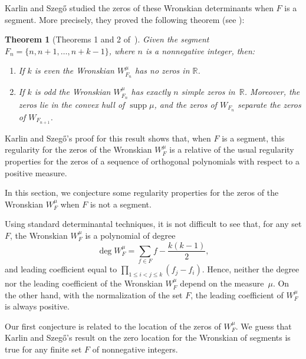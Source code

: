 \documentclass[10pt]{article}
\theoremstyle{plain}
\newtheorem{theorem}{Theorem}[section]
\theoremstyle{definition}
\numberwithin{equation}{section} %
\newcommand\RR{\mathbb{R}}
\newcommand\supp{\operatorname{supp}}
\begin{document}

Karlin and Szeg\H{o} studied the zeros of these Wronskian determinants when $F$ is a segment. 
More precisely, they proved the following theorem (see \cite{KS}):

\begin{theorem}[Theorems 1 and 2 of~\cite{KS}]
\label{KST12}
Given the segment $F_n=\{n,\allowbreak n+1,\allowbreak\dots,\allowbreak n+k-1\}$, where $n$ is a nonnegative integer, then:
\begin{enumerate}
\item If $k$ is even the Wronskian $W_{F_n}^\mu$ has no zeros in $\RR$.
\item If $k$ is odd the Wronskian $W_{F_n}^\mu$ has exactly $n$ simple zeros in~$\RR$. Moreover, the zeros lie in the convex hull of $\supp\mu$, and the zeros of $W_{F_n}$ separate the zeros of $W_{F_{n+1}}$.
\end{enumerate}
\end{theorem}

Karlin and Szeg\H{o}'s proof for this result shows that, when $F$ is a segment, this regularity for the zeros of the Wronskian $W_F^\mu$ is a relative of the usual regularity properties for the zeros of a sequence of orthogonal polynomials  with respect to a positive measure.

In this section, we conjecture some regularity properties for the zeros of the Wronskian $W_F^\mu$ when $F$ is not a segment.

Using standard determinantal techniques, it is not difficult to see that,
for any set $F$, the Wronskian $W_F^\mu$ is a polynomial of degree
\begin{equation}\label{degWf}
\deg W^\mu _F=\sum_{f\in F}f-\frac{k(k-1)}{2},
\end{equation}
and leading coefficient equal
to $\prod_{1\le i<j\le k}(f_j-f_i)$. Hence,
neither the degree nor the
leading coefficient of the Wronskian $W_F^\mu$ depend on the
measure~$\mu$. On the other hand, with the normalization of the
set $F$, the leading coefficient of $W_F^\mu$ is always positive.

Our first conjecture is related to the location of the zeros of $W_F^\mu$. We guess that Karlin and Szeg\H{o}'s result on the zero location for the Wronskian of segments is true for any finite set $F$ of nonnegative integers.
\end{document}
